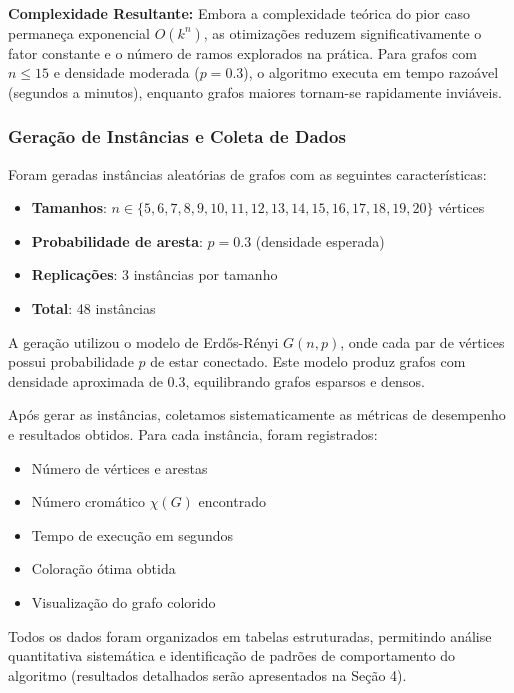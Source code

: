 \documentclass[12pt]{article}
\begin{document}
\textbf{Complexidade Resultante:} Embora a complexidade teórica do pior caso permaneça exponencial $O(k^n)$, as otimizações reduzem significativamente o fator constante e o número de ramos explorados na prática. Para grafos com $n \leq 15$ e densidade moderada ($p = 0.3$), o algoritmo executa em tempo razoável (segundos a minutos), enquanto grafos maiores tornam-se rapidamente inviáveis.

\subsubsection{Geração de Instâncias e Coleta de Dados}

Foram geradas instâncias aleatórias de grafos com as seguintes características:

\begin{itemize}
    \item \textbf{Tamanhos}: $n \in \{5, 6, 7, 8, 9, 10, 11, 12, 13, 14, 15, 16, 17, 18, 19, 20\}$ vértices
    \item \textbf{Probabilidade de aresta}: $p = 0.3$ (densidade esperada)
    \item \textbf{Replicações}: 3 instâncias por tamanho
    \item \textbf{Total}: 48 instâncias
\end{itemize}

A geração utilizou o modelo de Erdős-Rényi $G(n, p)$, onde cada par de vértices possui probabilidade $p$ de estar conectado. Este modelo produz grafos com densidade aproximada de 0.3, equilibrando grafos esparsos e densos.

Após gerar as instâncias, coletamos sistematicamente as métricas de desempenho e resultados obtidos. Para cada instância, foram registrados:

\begin{itemize}
    \item Número de vértices e arestas
    \item Número cromático $\chi(G)$ encontrado
    \item Tempo de execução em segundos
    \item Coloração ótima obtida
    \item Visualização do grafo colorido
\end{itemize}

Todos os dados foram organizados em tabelas estruturadas, permitindo análise quantitativa sistemática e identificação de padrões de comportamento do algoritmo (resultados detalhados serão apresentados na Seção 4).
\end{document}
